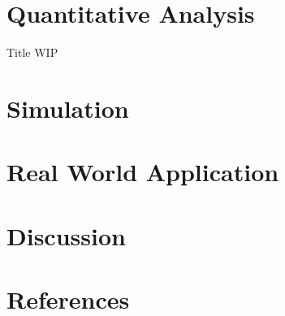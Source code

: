 \documentclass[]{article}
\begin{document}
	\section{Quantitative Analysis} Title WIP
	
	
	\section{Simulation}
	\section{Real World Application}
	\section{Discussion}
	\section{References}
	\printbibliography
	
\end{document}
